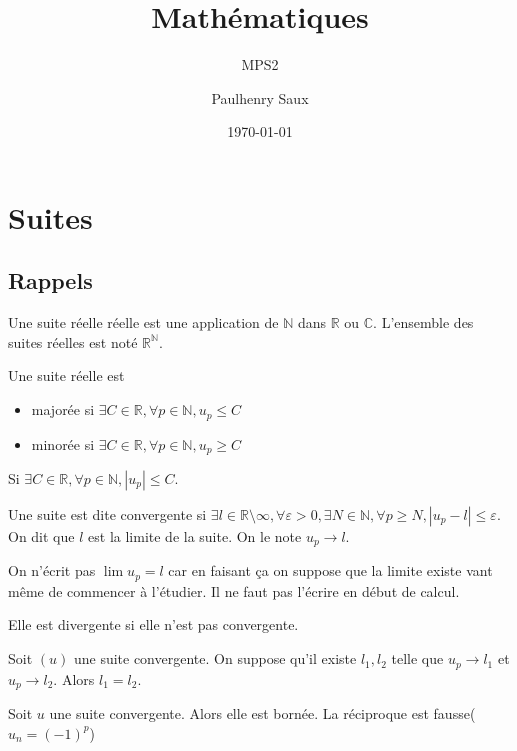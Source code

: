 \documentclass[french]{yLectureNote}
\title{Mathématiques}
\subtitle{MPS2}
\author{Paulhenry Saux}
\date{\today}
\newcommand{\N}[0]{\mathbb{N}}
\newcommand{\R}[0]{\mathbb{R}}
\newcommand{\C}[0]{\mathbb{C}}
\begin{document}

	\chapter{Suites}
\section{Rappels}
\begin{definition}
Une suite réelle réelle est une application de $\N$ dans $\R$ ou $\C$. L'ensemble des suites réelles est noté $\R^{\N}$.
\end{definition}
\begin{definition}
Une suite réelle est \begin{itemize}
               \item majorée si $\exists C\in\R, \forall p\in\N,u_p \leq C$
               \item minorée si $\exists C\in\R, \forall p\in\N,u_p \geq C$
              \end{itemize}

\end{definition}
\begin{definition}
Si $\exists C\in\R, \forall p\in\N, |u_p|\leq C$.
\end{definition}
\begin{definition}
Une suite est dite convergente si $\exists l\in\R \setminus {\infty}, \forall \varepsilon >0,\exists N\in\N, \forall p\geq N, |u_p-l|\leq \varepsilon$. On dit que $l$ est la limite de la suite. On le note $u_p \to l$.
\end{definition}
On n'écrit pas $\lim u_p = l$ car en faisant ça on suppose que la limite existe vant m\^eme de commencer à l'étudier. Il ne faut pas l'écrire en début de calcul.
\begin{definition}
Elle est divergente si elle n'est pas convergente.
\end{definition}
\begin{proposition}
Soit $(u)$ une suite convergente. On suppose qu'il existe $l_1,l_2$ telle que $u_p\to l_1$ et $u_p\to l_2$. Alors $l_1=l_2$.
\end{proposition}
\begin{proposition}
Soit $u$ une suite convergente. Alors elle est bornée. La réciproque est fausse($u_n = (-1)^p$)
\end{proposition}
\end{document}
